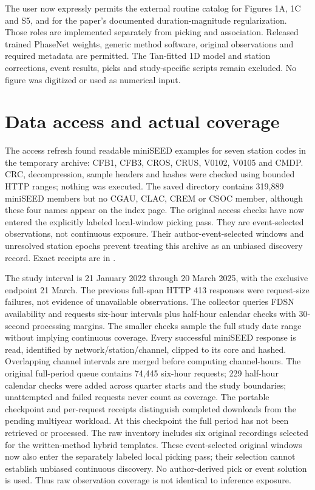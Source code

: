 The user now expressly permits the external routine catalog for Figures 1A, 1C and S5, and for the paper's documented duration-magnitude regularization. Those roles are implemented separately from picking and association. Released trained PhaseNet weights, generic method software, original observations and required metadata are permitted. The Tan-fitted 1D model and station corrections, event results, picks and study-specific scripts remain excluded. No figure was digitized or used as numerical input.

\section{Data access and actual coverage}
The access refresh found readable miniSEED examples for seven station codes in the temporary archive: CFB1, CFB3, CROS, CRUS, V0102, V0105 and CMDP. CRC, decompression, sample headers and hashes were checked using bounded HTTP ranges; nothing was executed. The saved directory contains 319,889 miniSEED members but no CGAU, CLAC, CREM or CSOC member, although these four names appear on the index page. The original access checks have now entered the explicitly labeled local-window picking pass. They are event-selected observations, not continuous exposure. Their author-event-selected windows and unresolved station epochs prevent treating this archive as an unbiased discovery record. Exact receipts are in .



The study interval is 21 January 2022 through 20 March 2025, with the exclusive endpoint 21 March. The previous full-span HTTP 413 responses were request-size failures, not evidence of unavailable observations. The collector queries FDSN availability and requests six-hour intervals plus half-hour calendar checks with 30-second processing margins. The smaller checks sample the full study date range without implying continuous coverage. Every successful miniSEED response is read, identified by network/station/channel, clipped to its core and hashed. Overlapping channel intervals are merged before computing channel-hours. The original full-period queue contains 74,445 six-hour requests; 229 half-hour calendar checks were added across quarter starts and the study boundaries; unattempted and failed requests never count as coverage. The portable checkpoint and per-request receipts distinguish completed downloads from the pending multiyear workload. At this checkpoint the full period has not been retrieved or processed. The raw inventory includes six original recordings selected for the written-method hybrid templates. These event-selected original windows now also enter the separately labeled local picking pass; their selection cannot establish unbiased continuous discovery. No author-derived pick or event solution is used. Thus raw observation coverage is not identical to inference exposure.

